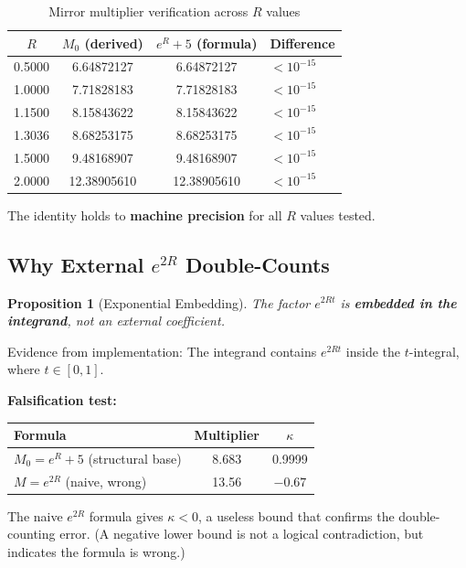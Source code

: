 \documentclass[11pt]{article}
\newtheorem{proposition}{Proposition}
\begin{document}
\begin{table}[h]
\centering
\caption{Mirror multiplier verification across $R$ values}
\begin{tabular}{cccl}
\toprule
$R$ & $M_0$ (derived) & $e^R + 5$ (formula) & Difference \\
\midrule
0.5000 & 6.64872127 & 6.64872127 & $< 10^{-15}$ \\
1.0000 & 7.71828183 & 7.71828183 & $< 10^{-15}$ \\
1.1500 & 8.15843622 & 8.15843622 & $< 10^{-15}$ \\
1.3036 & 8.68253175 & 8.68253175 & $< 10^{-15}$ \\
1.5000 & 9.48168907 & 9.48168907 & $< 10^{-15}$ \\
2.0000 & 12.38905610 & 12.38905610 & $< 10^{-15}$ \\
\bottomrule
\end{tabular}
\end{table}

The identity holds to \textbf{machine precision} for all $R$ values tested.

\subsection{Why External $e^{2R}$ Double-Counts}

\begin{proposition}[Exponential Embedding]
The factor $e^{2Rt}$ is \textbf{embedded in the integrand}, not an external coefficient.
\end{proposition}

Evidence from implementation: The integrand contains $e^{2Rt}$ inside the $t$-integral, where $t \in [0,1]$.

\textbf{Falsification test:}
\begin{center}
\begin{tabular}{lcc}
\toprule
Formula & Multiplier & $\kappa$ \\
\midrule
$M_0 = e^R + 5$ (structural base) & 8.683 & 0.9999 \\
$M = e^{2R}$ (naive, wrong) & 13.56 & \textcolor{signflip}{\textbf{$-0.67$}} \\
\bottomrule
\end{tabular}
\end{center}

The naive $e^{2R}$ formula gives $\kappa < 0$, a useless bound that confirms the double-counting error. (A negative lower bound is not a logical contradiction, but indicates the formula is wrong.)
\end{document}
